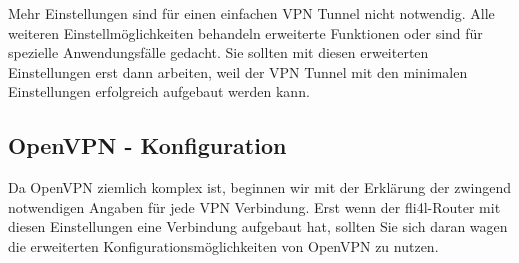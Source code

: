 Mehr Einstellungen sind für einen einfachen VPN Tunnel nicht
notwendig. Alle weiteren Einstellmöglichkeiten behandeln erweiterte
Funktionen oder sind für spezielle Anwendungsfälle gedacht. Sie
sollten mit diesen erweiterten Einstellungen erst dann arbeiten, weil
der VPN Tunnel mit den minimalen Einstellungen erfolgreich aufgebaut
werden kann.

\subsection{OpenVPN - Konfiguration}

Da OpenVPN ziemlich komplex ist, beginnen wir mit der Erklärung der
zwingend notwendigen Angaben für jede VPN Verbindung. Erst wenn der
fli4l-Router mit diesen Einstellungen eine Verbindung aufgebaut hat,
sollten Sie sich daran wagen die erweiterten
Konfigurationsmöglichkeiten von OpenVPN zu nutzen.

